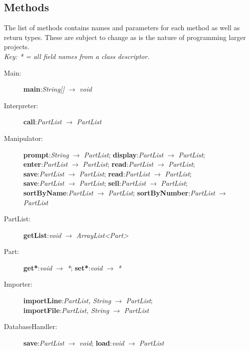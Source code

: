 \documentclass{report}
\begin{document}
\subsection{Methods}
The list of methods contains names and parameters for each method as well as return types. These are subject to change as is the nature of programming larger projects.\\
\textit{Key: * = all field names from a class descriptor.}
\begin{description}
  \item [Main:] \textbf{main}:\textit{String[]} $\rightarrow$ \textit{void}
  \item [Interpreter:] \textbf{call}:\textit{PartList} $\rightarrow$ \textit{PartList}
  \item [Manipulator:] \textbf{prompt}:\textit{String} $\rightarrow$ \textit{PartList}; \textbf{display}:\textit{PartList} $\rightarrow$ \textit{PartList};\\
    \textbf{enter}:\textit{PartList} $\rightarrow$ \textit{PartList}; \textbf{read}:\textit{PartList} $\rightarrow$ \textit{PartList};\\
    \textbf{save}:\textit{PartList} $\rightarrow$ \textit{PartList}; \textbf{read}:\textit{PartList} $\rightarrow$ \textit{PartList};\\
    \textbf{save}:\textit{PartList} $\rightarrow$ \textit{PartList}; \textbf{sell}:\textit{PartList} $\rightarrow$ \textit{PartList};\\
    \textbf{sortByName}:\textit{PartList} $\rightarrow$ \textit{PartList}; \textbf{sortByNumber}:\textit{PartList} $\rightarrow$ \textit{PartList}
  \item [PartList:] \textbf{getList}:\textit{void} $\rightarrow$ \textit{ArrayList<Part>}
  \item [Part:] \textbf{get*}:\textit{void} $\rightarrow$ \textit{*}; \textbf{set*}:\textit{void} $\rightarrow$ \textit{*}
  \item [Importer:] \textbf{importLine}:\textit{PartList, String} $\rightarrow$ \textit{PartList};\\
    \textbf{importFile}:\textit{PartList, String} $\rightarrow$ \textit{PartList}
  \item [DatabaseHandler:] \textbf{save}:\textit{PartList} $\rightarrow$ \textit{void}; \textbf{load}:\textit{void} $\rightarrow$ \textit{PartList}
\end{description}
\end{document}
